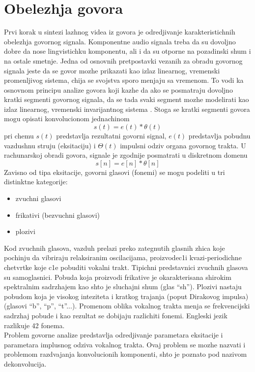 \documentclass[a4paper, openany, oneside, 11pt]{book}
\begin{document}
\chapter{Obelezhja govora}
Prvi korak u sintezi lazhnog videa iz govora je odredjivanje karakteristichnih obelezhja govornog signala. Komponentne audio signala treba da su dovoljno dobre da nose lingvistichku komponentu, ali i da su otporne na pozadinski shum i na ostale smetnje.
Jedna od osnovnih pretpostavki vezanih za obradu govornog signala jeste da se govor mozhe prikazati kao izlaz linearnog, vremenski promenljivog sistema, chija se svojstva sporo menjaju sa vremenom. To vodi ka osnovnom principu analize govora koji kazhe da ako se posmatraju dovoljno kratki segmenti govornog signala, da se tada svaki segment mozhe modelirati kao izlaz linearnog, vremenski invarijantnog sistema \cite{OPGpredavanja}. Stoga se kratki segmenti govora mogu opisati konvolucionom jednachinom
\begin{equation}\label{eq:1.1}
s(t) = e(t)*\theta(t)
\end{equation}
pri chemu $s(t)$ predstavlja rezultatni govorni signal, $e(t)$ predstavlja pobudnu vazdushnu struju (eksitaciju) i $\Theta(t)$ impulsni odziv organa govornog trakta. U rachunarskoj obradi govora, signale je zgodnije posmatrati u diskretnom domenu
\begin{equation}
s[n] = e[n]*\theta[n]
\end{equation}
Zavisno od tipa eksitacije, govorni glasovi (fonemi) se mogu podeliti u tri distinktne kategorije:
\begin{itemize}[noitemsep]
\item zvuchni glasovi
\item frikativi (bezvuchni glasovi)
\item plozivi
\end{itemize}
Kod zvuchnih glasova, vazduh prelazi preko zategnutih glasnih zhica koje po\-chinju da vibriraju relaksiranim oscilacijama, proizvodec1i kvazi-periodichne chetvrtke koje c1e pobuditi vokalni trakt. Tipichni predstavnici zvuchnih glasova su samoglasnici. Pobuda koja proizvodi frikative je okarakterisana shirokim spektralnim sadrzhajem kao shto je sluchajni shum (glas \enquote{sh}). Plozivi nastaju pobudom koja je visokog inteziteta i kratkog trajanja (poput Dirakovog impulsa) (glasovi \enquote{b}, \enquote{p}, \enquote{t}...). Promenom oblika vokalnog trakta menja se frekvencijski sadrzhaj pobude i kao rezultat se dobijaju razlichiti fonemi. Engleski jezik razlikuje 42 fonema.\\
Problem govorne analize predstavlja odredjivanje parametara eksitacije i parametara implusnog odziva vokalnog trakta. Ovaj problem se mozhe nazvati i problemom razdvajanja konvolucionih komponenti, shto je poznato pod nazivom dekonvolucija.
\end{document}
